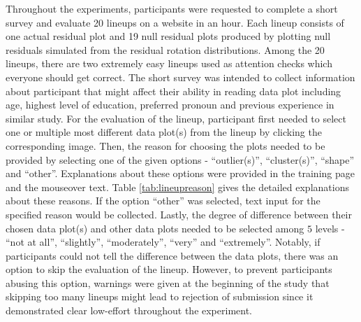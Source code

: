 \documentclass{monashthesis}
\theoremstyle{definition}
\theoremstyle{definition}
\theoremstyle{definition}
\theoremstyle{definition}
\theoremstyle{remark}
\begin{document}
Throughout the experiments, participants were requested to complete a short survey and evaluate 20 lineups on a website in an hour. Each lineup consists of one actual residual plot and 19 null residual plots produced by plotting null residuals simulated from the residual rotation distributions. Among the 20 lineups, there are two extremely easy lineups used as attention checks which everyone should get correct. The short survey was intended to collect information about participant that might affect their ability in reading data plot including age, highest level of education, preferred pronoun and previous experience in similar study. For the evaluation of the lineup, participant first needed to select one or multiple most different data plot(s) from the lineup by clicking the corresponding image. Then, the reason for choosing the plots needed to be provided by selecting one of the given options - ``outlier(s)'', ``cluster(s)'', ``shape'' and ``other''. Explanations about these options were provided in the training page and the mouseover text. Table \ref{tab:lineupreason} gives the detailed explanations about these reasons. If the option ``other'' was selected, text input for the specified reason would be collected. Lastly, the degree of difference between their chosen data plot(s) and other data plots needed to be selected among \(5\) levels - ``not at all'', ``slightly'', ``moderately'', ``very'' and ``extremely''. Notably, if participants could not tell the difference between the data plots, there was an option to skip the evaluation of the lineup. However, to prevent participants abusing this option, warnings were given at the beginning of the study that skipping too many lineups might lead to rejection of submission since it demonstrated clear low-effort throughout the experiment.

\begin{table}

\caption{\label{tab:lineupreason}Explanations about reasons for choosing data plots from a lineup}
\centering
{}
\end{table}
\end{document}
